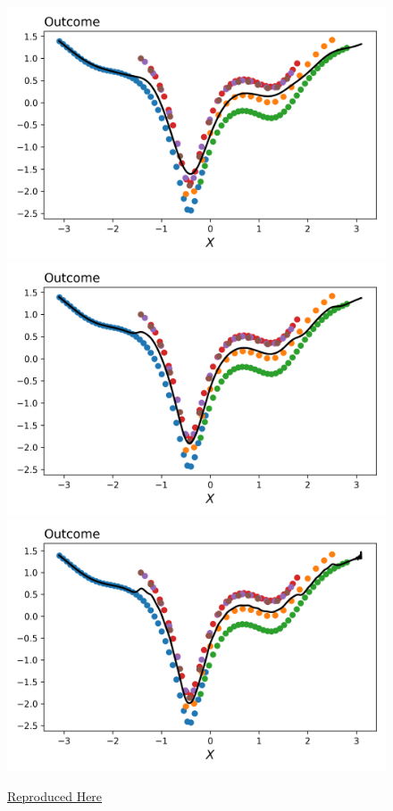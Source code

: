 \documentclass[a4paper,12pt]{article}
\begin{document}
\begin{figure}[htbp]
\includegraphics[scale=0.3]{figures/framework/local_linear_no_const_5.0_18_LM.png}
\includegraphics[scale=0.3]{figures/framework/local_linear_no_const_10.0_18_LM.png}
\includegraphics[scale=0.3]{figures/framework/local_linear_no_const_15.0_18_LM.png}
\caption{\href{https://github.com/pharringtonp19/rfp/blob/main/notebooks/local_weighted_linear_regression_no_avg_effect_LM.ipynb}{Reproduced Here}}
\label{fig:nonparametrics}
\end{figure}
\end{document}
